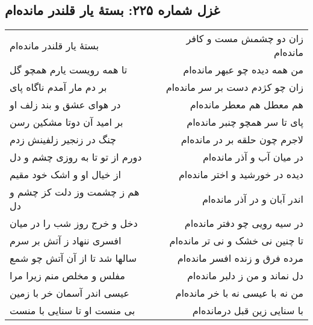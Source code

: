 \begin{center}
\section*{غزل شماره ۲۲۵: بستهٔ یار قلندر مانده‌ام}
\label{sec:225}
\begin{longtable}{l p{0.5cm} r}
بستهٔ یار قلندر مانده‌ام
&&
زان دو چشمش مست و کافر مانده‌ام
\\
تا همه رویست یارم همچو گل
&&
من همه دیده چو عبهر مانده‌ام
\\
بر دم مار آمدم ناگاه پای
&&
زان چو کژدم دست بر سر مانده‌ام
\\
در هوای عشق و بند زلف او
&&
هم معطل هم معطر مانده‌ام
\\
بر امید آن دوتا مشکین رسن
&&
پای تا سر همچو چنبر مانده‌ام
\\
چنگ در زنجیر زلفینش زدم
&&
لاجرم چون حلقه بر در مانده‌ام
\\
دورم از تو تا به روزی چشم و دل
&&
در میان آب و آذر مانده‌ام
\\
از خیال او و اشک خود مقیم
&&
دیده در خورشید و اختر مانده‌ام
\\
هم ز چشمت وز دلت کز چشم و دل
&&
اندر آبان و در آذر مانده‌ام
\\
دخل و خرج روز شب را در میان
&&
در سیه رویی چو دفتر مانده‌ام
\\
افسری ننهاد ز آتش بر سرم
&&
تا چنین نی خشک و نی تر مانده‌ام
\\
سالها شد تا از آن آتش چو شمع
&&
مرده فرق و زنده افسر مانده‌ام
\\
مفلس و مخلص منم زیرا مرا
&&
دل نماند و من ز دلبر مانده‌ام
\\
عیسی اندر آسمان خر با زمین
&&
من نه با عیسی نه با خر مانده‌ام
\\
بی منست او تا سنایی با منست
&&
با سنایی زین قبل درمانده‌ام
\\
\end{longtable}
\end{center}
